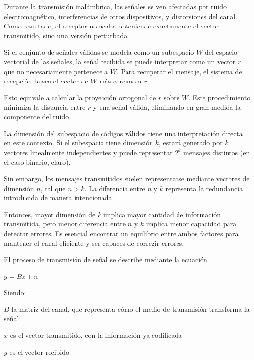 \documentclass[letterpaper,12pt]{article}
\begin{document}
Durante la transmisión inalámbrica, las señales se ven afectadas por ruido electromagnético,
interferencias de otros dispositivos, y distorsiones del canal. Como resultado, el receptor no acaba
obteniendo exactamente el vector transmitido, sino una versión perturbada.

Si el conjunto de señales válidas se modela como un subespacio $W$ del espacio vectorial de las
señales, la señal recibida se puede interpretar como un vector $r$ que no necesariamente pertenece a
$W$. Para recuperar el mensaje, el sistema de recepción busca el vector de $W$ más cercano a $r$.

Esto equivale a calcular la proyección ortogonal de $r$ sobre $W$. Este procedimiento minimiza la
distancia entre $r$ y una señal válida, eliminando en gran medida la componente del ruido.





\newpage
{}
La dimensión del subespacio de códigos válidos tiene una interpretación directa en este contexto.
Si el subespacio tiene dimensión $k$, estará generado por $k$ vectores linealmente independientes y
puede representar $2^k$ mensajes distintos (en el caso binario, claro).

Sin embargo, los mensajes transmitidos suelen representarse mediante vectores de dimensión $n$,
tal que $n>k$. La diferencia entre $n$ y $k$ representa la redundancia introducida de manera intencionada.

Entonces, mayor dimensión de $k$ implica mayor cantidad de información transmitida, pero menor
diferencia entre $n$ y $k$ implica menor capacidad para detectar errores. Es esencial encontrar un
equilibrio entre ambos factores para mantener el canal eficiente y ser capaces de corregir errores.

El proceso de transmisión de señal se describe mediante la ecuación

\centerline{$y=Bx+n$}

Siendo:

$B$ la matriz del canal, que representa cómo el medio de transmisión transforma la señal

$x$ es el vector transmitido, con la información ya codificada

$y$ es el vector recibido
\end{document}
